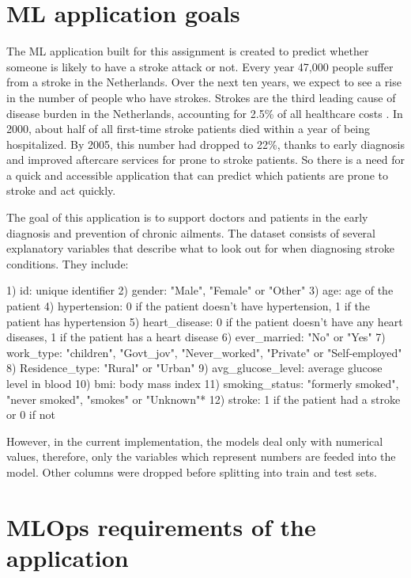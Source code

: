 \section{ML application goals}

The ML application built for this assignment is created to predict whether someone is likely to have a stroke attack or not. Every year 47,000 people suffer from a stroke in the Netherlands. Over the next ten years, we expect to see a rise in the number of people who have strokes. Strokes are the third leading cause of disease burden in the Netherlands, accounting for 2.5\% of all healthcare costs . In 2000, about half of all first-time stroke patients died within a year of being hospitalized. By 2005, this number had dropped to 22\%, thanks to early diagnosis and improved aftercare services for prone to stroke patients. So there is a need for a quick and accessible application that can predict which patients are prone to stroke and act quickly. \cite{vat2016development}

The goal of this application is to support doctors and patients in the early diagnosis and prevention of chronic ailments. The dataset consists of several explanatory variables that describe what to look out for when diagnosing stroke conditions. They include:

1) id: unique identifier
2) gender: "Male", "Female" or "Other"
3) age: age of the patient
4) hypertension: 0 if the patient doesn't have hypertension, 1 if the patient has hypertension
5) heart\_disease: 0 if the patient doesn't have any heart diseases, 1 if the patient has a heart disease
6) ever\_married: "No" or "Yes"
7) work\_type: "children", "Govt\_jov", "Never\_worked", "Private" or "Self-employed"
8) Residence\_type: "Rural" or "Urban"
9) avg\_glucose\_level: average glucose level in blood
10) bmi: body mass index
11) smoking\_status: "formerly smoked", "never smoked", "smokes" or "Unknown"*
12) stroke: 1 if the patient had a stroke or 0 if not

However, in the current implementation, the models deal only with numerical values, therefore, only the variables which represent numbers are feeded into the model. Other columns were dropped before splitting into train and test sets.




\section{MLOps requirements of the application }



